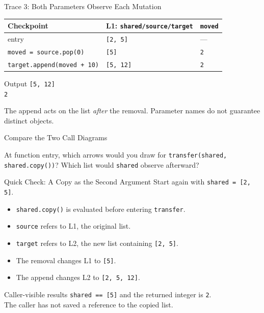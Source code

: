\documentclass[aspectratio=169,10pt]{beamer}
\begin{document}
\begin{frame}{Trace 3: Both Parameters Observe Each Mutation}
  \begin{center}
    \renewcommand{\arraystretch}{1.4}
    \begin{tabular}{l|l|l}
      \textbf{Checkpoint} & \textbf{L1: \texttt{shared/source/target}} & \texttt{moved} \\\hline
      entry & \texttt{[2, 5]} & --- \\
      \texttt{moved = source.pop(0)} & \texttt{[5]} & \texttt{2} \\
      \texttt{target.append(moved + 10)} & \texttt{[5, 12]} & \texttt{2}
    \end{tabular}
  \end{center}
  \begin{block}{Output}
    \texttt{[5, 12]}\\
    \texttt{2}
  \end{block}
  The append acts on the list \emph{after} the removal. Parameter names do not guarantee distinct objects.
\end{frame}

\begin{frame}{Compare the Two Call Diagrams}
  \begin{center}
    \resizebox{0.94\linewidth}{!}{\twoparameterdiagram}
  \end{center}
  \begin{activity}
    At function entry, which arrows would you draw for \texttt{transfer(shared, shared.copy())}? Which list would \texttt{shared} observe afterward?
  \end{activity}
\end{frame}

\begin{frame}{Quick Check: A Copy as the Second Argument}
  Start again with \texttt{shared = [2, 5]}.
  \begin{itemize}
    \item \texttt{shared.copy()} is evaluated before entering \texttt{transfer}.
    \item \texttt{source} refers to L1, the original list.
    \item \texttt{target} refers to L2, the new list containing \texttt{[2, 5]}.
    \item The removal changes L1 to \texttt{[5]}.
    \item The append changes L2 to \texttt{[2, 5, 12]}.
  \end{itemize}
  \begin{block}{Caller-visible results}
    \texttt{shared == [5]} and the returned integer is \texttt{2}.\\
    The caller has not saved a reference to the copied list.
  \end{block}
\end{frame}
\end{document}
